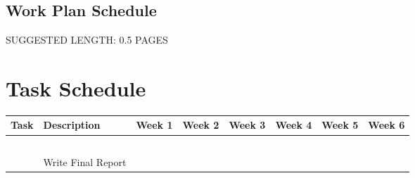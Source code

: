 \documentclass[12pt]{article}
\begin{document}
\subsection{Work Plan Schedule}\label{Work Plan Schedule}
    \colorbox{BurntOrange}{SUGGESTED LENGTH: 0.5 PAGES}


\section{Task Schedule}

\begin{center}
    \begin{tabular}{ | M{1cm} | M{5cm} | M{1cm} | M{1cm} | M{1cm} | M{1cm} | M{1cm} | M{1cm} | }
        \hline
        \textbf{Task} & \textbf{Description} & Week 1 & Week 2 & Week 3 & Week 4 & Week 5 & Week 6 \\
        \hline
        &  &  &  &  &  &  & \\
        \hline
        &  &  &  &  &  &  & \\
        \hline
        &  &  &  &  &  &  & \\
        \hline
        &  &  &  &  &  &  & \\
        \hline
        &  &  &  &  &  &  & \\
        \hline
        & Write Final Report &  &  &  &  &  & \\
        \hline
    \end{tabular}
\end{center}
\end{document}
